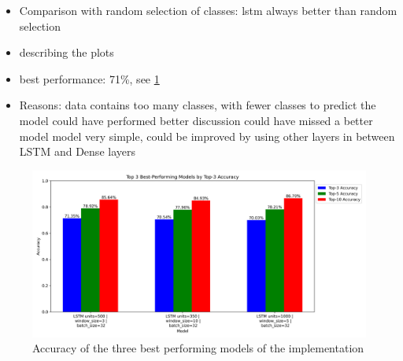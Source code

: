 \begin{itemize}
    \item Comparison with random selection of classes: lstm always better than random selection
    \item describing the plots
    \item best performance: 71\%, see \cref{fig:top3_best_models}
    \item Reasons:
    \subitem data contains too many classes, with fewer classes to predict the model could have performed better
    \subitem discussion could have missed a better model
    \subitem model very simple, could be improved by using other layers in between LSTM and Dense layers
\end{itemize}

\begin{figure}[h!]
    \centering
    \includegraphics[scale=0.4]{images/top3_best_models.png}
    \caption{Accuracy of the three best performing models of the implementation}
    \label{fig:top3_best_models}
\end{figure}



